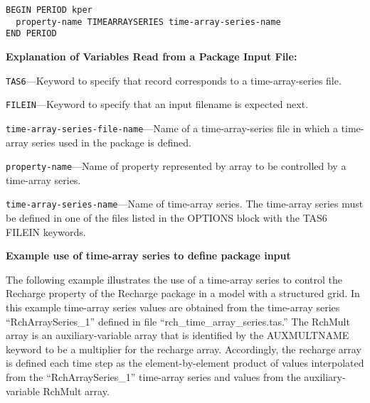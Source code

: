\begin{lstlisting}[style=blockdefinition]
BEGIN PERIOD kper
  property-name TIMEARRAYSERIES time-array-series-name
END PERIOD
\end{lstlisting}

\noindent \textbf{Explanation of Variables Read from a Package Input File:}

\begin{description}
\item \texttt{TAS6}---Keyword to specify that record corresponds to a time-array-series file.
\item \texttt{FILEIN}---Keyword to specify that an input filename is expected next.
\item \texttt{time-array-series-file-name}---Name of a time-array-series file in which a time-array series used in the package is defined.
\end{description}

\begin{description}
\item \texttt{property-name}---Name of property represented by array to be controlled by a time-array series.
\end{description}

\begin{description}
\item \texttt{time-array-series-name}---Name of time-array series. The time-array series must be defined in one of the files listed in the OPTIONS block with the TAS6 FILEIN keywords.
\end{description}

\vspace{5 mm}

\noindent \textbf{Example use of time-array series to define package input}

The following example illustrates the use of a time-array series to control the Recharge property of the Recharge package in a model with a structured grid. In this example time-array series values are obtained from the time-array series ``RchArraySeries\_1'' defined in file ``rch\_time\_array\_series.tas.'' The RchMult array is an auxiliary-variable array that is identified by the AUXMULTNAME keyword to be a multiplier for the recharge array. Accordingly, the recharge array is defined each time step as the element-by-element product of values interpolated from the ``RchArraySeries\_1'' time-array series and values from the auxiliary-variable RchMult array.

